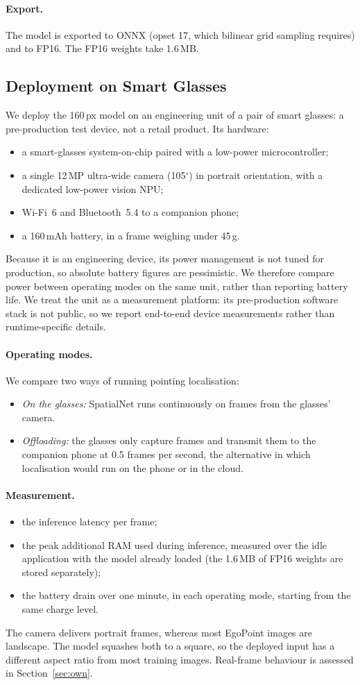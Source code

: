 \paragraph{Export.} The model is exported to ONNX (opset 17, which bilinear grid sampling requires) and to FP16. The FP16 weights take 1.6\,MB.

\subsection{Deployment on Smart Glasses}\label{sec:device}
We deploy the 160\,px model on an engineering unit of a pair of smart glasses: a pre-production test device, not a retail product. Its hardware:
\begin{itemize}
\item a smart-glasses system-on-chip paired with a low-power microcontroller;
\item a single 12\,MP ultra-wide camera (105$^\circ$) in portrait orientation, with a dedicated low-power vision NPU;
\item Wi-Fi~6 and Bluetooth~5.4 to a companion phone;
\item a 160\,mAh battery, in a frame weighing under 45\,g.
\end{itemize}
Because it is an engineering device, its power management is not tuned for production, so absolute battery figures are pessimistic. We therefore compare power between operating modes on the same unit, rather than reporting battery life. We treat the unit as a measurement platform: its pre-production software stack is not public, so we report end-to-end device measurements rather than runtime-specific details.

\paragraph{Operating modes.} We compare two ways of running pointing localisation:
\begin{itemize}
\item \emph{On the glasses:} SpatialNet runs continuously on frames from the glasses' camera.
\item \emph{Offloading:} the glasses only capture frames and transmit them to the companion phone at 0.5 frames per second, the alternative in which localisation would run on the phone or in the cloud.
\end{itemize}

\paragraph{Measurement.}
\begin{itemize}
\item the inference latency per frame;
\item the peak additional RAM used during inference, measured over the idle application with the model already loaded (the 1.6\,MB of FP16 weights are stored separately);
\item the battery drain over one minute, in each operating mode, starting from the same charge level.
\end{itemize}

The camera delivers portrait frames, whereas most EgoPoint images are landscape. The model squashes both to a square, so the deployed input has a different aspect ratio from most training images. Real-frame behaviour is assessed in Section~\ref{sec:own}.
